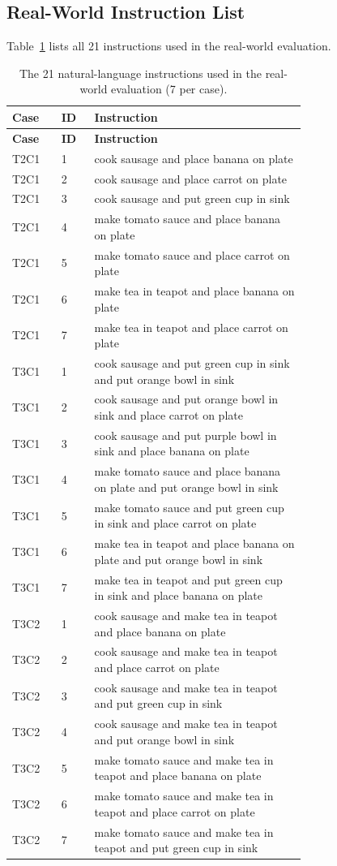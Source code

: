 \documentclass[letterpaper,10pt,onecolumn]{IEEEtran}
\begin{document}
\subsection{Real-World Instruction List}\label{supp:instructions}
Table~\ref{tab:supp_instructions} lists all 21 instructions used in the
real-world evaluation.
{\small
\begin{longtable}{@{}llp{0.72\linewidth}@{}}
\caption{The 21 natural-language instructions used in the real-world
evaluation (7 per case).}
\label{tab:supp_instructions}\\
\toprule
\textbf{Case} & \textbf{ID} & \textbf{Instruction} \\
\midrule
\endfirsthead
\toprule
\textbf{Case} & \textbf{ID} & \textbf{Instruction} \\
\midrule
\endhead
\bottomrule
\endfoot
T2C1 & 1 & cook sausage and place banana on plate \\
T2C1 & 2 & cook sausage and place carrot on plate \\
T2C1 & 3 & cook sausage and put green cup in sink \\
T2C1 & 4 & make tomato sauce and place banana on plate \\
T2C1 & 5 & make tomato sauce and place carrot on plate \\
T2C1 & 6 & make tea in teapot and place banana on plate \\
T2C1 & 7 & make tea in teapot and place carrot on plate \\
\midrule
T3C1 & 1 & cook sausage and put green cup in sink and put orange bowl in sink \\
T3C1 & 2 & cook sausage and put orange bowl in sink and place carrot on plate \\
T3C1 & 3 & cook sausage and put purple bowl in sink and place banana on plate \\
T3C1 & 4 & make tomato sauce and place banana on plate and put orange bowl in sink \\
T3C1 & 5 & make tomato sauce and put green cup in sink and place carrot on plate \\
T3C1 & 6 & make tea in teapot and place banana on plate and put orange bowl in sink \\
T3C1 & 7 & make tea in teapot and put green cup in sink and place banana on plate \\
\midrule
T3C2 & 1 & cook sausage and make tea in teapot and place banana on plate \\
T3C2 & 2 & cook sausage and make tea in teapot and place carrot on plate \\
T3C2 & 3 & cook sausage and make tea in teapot and put green cup in sink \\
T3C2 & 4 & cook sausage and make tea in teapot and put orange bowl in sink \\
T3C2 & 5 & make tomato sauce and make tea in teapot and place banana on plate \\
T3C2 & 6 & make tomato sauce and make tea in teapot and place carrot on plate \\
T3C2 & 7 & make tomato sauce and make tea in teapot and put green cup in sink \\
\end{longtable}
}
\end{document}
